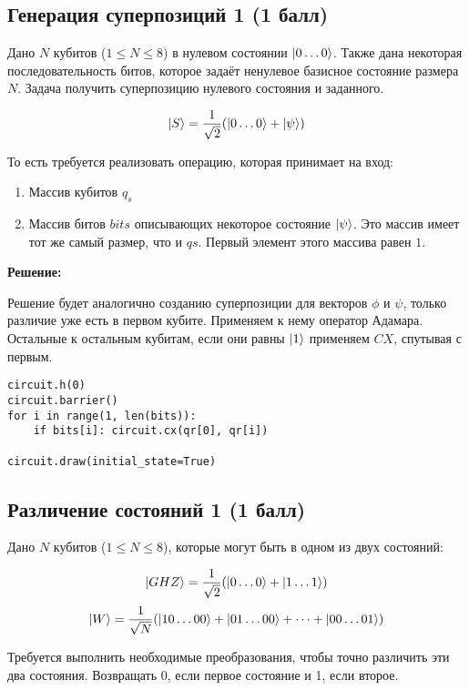 \documentclass[a4paper]{article}
\begin{document}
\subsection{Генерация суперпозиций 1 (1 балл)}

Дано $N$ кубитов ($1 \le N \le 8$) в нулевом состоянии $\Ket{0\dots0}$. Также дана некоторая последовательность битов, которое задаёт ненулевое базисное состояние размера $N$. Задача получить суперпозицию нулевого состояния и заданного.

$$\Ket{S} = \frac{1}{\sqrt2}(\Ket{0\dots0} +\Ket{\psi})$$

То есть требуется реализовать операцию, которая принимает на вход:

\begin{enumerate}
    \item Массив кубитов $q_s$
    \item Массив битов $bits$ описывающих некоторое состояние $\Ket{\psi}$. Это массив имеет тот же самый размер, что и $qs$. Первый элемент этого массива равен $1$.
\end{enumerate}


\textbf{Решение:}

Решение будет аналогично созданию суперпозиции для векторов $\phi$ и $\psi$, только различие уже есть в первом кубите. Применяем к нему оператор Адамара. Остальные к остальным кубитам, если они равны $ \Ket{1} $ применяем $ CX $, спутывая с первым.

\begin{verbatim}
circuit.h(0)
circuit.barrier()
for i in range(1, len(bits)):
    if bits[i]: circuit.cx(qr[0], qr[i])

circuit.draw(initial_state=True)
\end{verbatim}

\subsection{Различение состояний 1 (1 балл)}

Дано $N$ кубитов ($1 \le N \le 8$), которые могут быть в одном из двух состояний:

$$\Ket{GHZ} = \frac{1}{\sqrt2}(\Ket{0\dots0} +\Ket{1\dots1})$$
$$\Ket{W} = \frac{1}{\sqrt N}(\Ket{10\dots00}+\Ket{01\dots00} + \dots +\Ket{00\dots01})$$

Требуется выполнить необходимые преобразования, чтобы точно различить эти два состояния. Возвращать $0$, если первое состояние и 1, если второе. 
\end{document}
